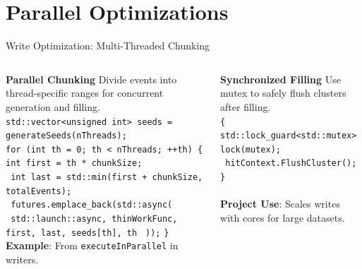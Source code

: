 \documentclass[aspectratio=169]{beamer}
\begin{document}
\section{Parallel Optimizations}
\begin{frame}{Write Optimization: Multi-Threaded Chunking}
  \begin{columns}
    \textbf{Parallel Chunking}
    \small Divide events into thread-specific ranges for concurrent generation and filling.
    \vspace{0.5em}\\
    \texttt{std::vector<unsigned int> seeds = generateSeeds(nThreads);} \\
    \texttt{for (int th = 0; th < nThreads; ++th) \{}
    \texttt{    int first = th * chunkSize;} \\
    \texttt{    int last = std::min(first + chunkSize, totalEvents);} \\
    \texttt{    futures.emplace\_back(std::async(} \\
    \texttt{        std::launch::async, thinWorkFunc, first, last, seeds[th], th} 
    \texttt{    ));} 
    \texttt{\}} 
    \vspace{0.5em}\\
    \textbf{Example}: From \texttt{executeInParallel} in writers.

    \textbf{Synchronized Filling}
    \small Use mutex to safely flush clusters after filling.
    \vspace{0.5em}\\
    \texttt{\{ std::lock\_guard<std::mutex> lock(mutex); } \\
    \texttt{    hitContext.FlushCluster(); \}} \\
    \vspace{0.5em}\\
    \textbf{Project Use}: Scales writes with cores for large datasets.
  \end{columns}
\end{frame}
\end{document}

